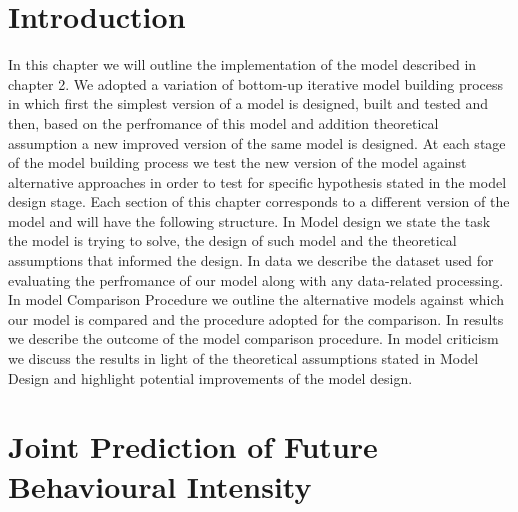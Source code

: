 \section{Introduction}
\label{implementation_testing_introduction}

In this chapter we will outline the implementation of the model described in chapter 2. We adopted a variation of bottom-up iterative model building process in which first the simplest version of a model is designed, built and tested and then, based on the perfromance of this model and addition theoretical assumption a new improved version of the same model is designed. At each stage of the model building process we test the new version of the model against alternative approaches in order to test for specific hypothesis stated in the model design stage. Each section of this chapter corresponds to a different version of the model and will have the following structure. In Model design we state the task the model is trying to solve, the design of such model and the theoretical assumptions that informed the design. In data we describe the dataset used for evaluating the perfromance of our model along with any data-related processing. In model Comparison Procedure we outline the alternative models against which our model is compared and the procedure adopted for the comparison. In results we describe the outcome of the model comparison procedure. In model criticism we discuss the results in light of the theoretical assumptions stated in Model Design and highlight potential improvements of the model design.

\section{Joint Prediction of Future Behavioural Intensity}
\label{model_architecture_1}

